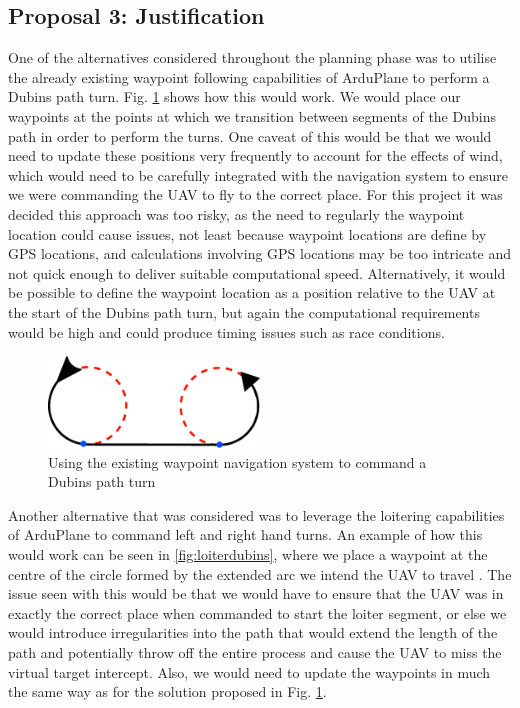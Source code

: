 \subsection{Proposal 3: Justification}
\label{future:alternatedubinsreason}
One of the alternatives considered throughout the planning phase was to utilise the already existing waypoint following capabilities of ArduPlane to perform a Dubins path turn. Fig. \ref{fig:waypointdubins} shows how this would work. We would place our waypoints at the points at which we transition between segments of the Dubins path in order to perform the turns. One caveat of this would be that we would need to update these positions very frequently to account for the effects of wind, which would need to be carefully integrated with the navigation system to ensure we were commanding the UAV to fly to the correct place. For this project it was decided this approach was too risky, as the need to regularly the waypoint location could cause issues, not least because waypoint locations are define by GPS locations, and calculations involving GPS locations may be too intricate and not quick enough to deliver suitable computational speed. Alternatively, it would be possible to define the waypoint location as a position relative to the UAV at the start of the Dubins path turn, but again the computational requirements would be high and could produce timing issues such as race conditions. 

\begin{figure}[htbp!] 
\centering    
\includegraphics[width=0.5\textwidth]{WaypointDubins}
\caption[Commanding a Dubins path turn using waypoint navigation]{Using the existing waypoint navigation system to command a Dubins path turn}
\label{fig:waypointdubins}
\end{figure} 

Another alternative that was considered was to leverage the loitering capabilities of ArduPlane to command left and right hand turns. An example of how this would work can be seen in \ref{fig:loiterdubins}, where we place a waypoint at the centre of the circle formed by the extended arc we intend the UAV to travel . The issue seen with this would be that we would have to ensure that the UAV was in exactly the correct place when commanded to start the loiter segment, or else we would introduce irregularities into the path that would extend the length of the path and potentially throw off the entire process and cause the UAV to miss the virtual target intercept. Also, we would need to update the waypoints in much the same way as for the solution proposed in Fig. \ref{fig:waypointdubins}.

